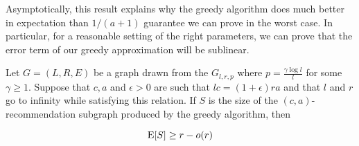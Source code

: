 Asymptotically, this result explains why the greedy
algorithm does much better in expectation than $1/(a+1)$ guarantee we
can prove in the worst case. In particular, for a reasonable setting of
the right parameters, we can prove that the error term of our greedy
approximation will be sublinear.

\begin{thm}
\label{simple-thm}
Let $G=(L,R,E)$ be a graph drawn from the $G_{l,r,p}$ where $p = \frac{\gamma \log l}{l}$ for some $\gamma \geq 1$. Suppose that $c, a$ and $\epsilon>0$ are such that $lc=(1+\epsilon)ra$ and that $l$ and $r$ go to infinity while satisfying this relation. If $S$ is the size of the $(c,a)$-recommendation subgraph produced by the greedy algorithm, then

\[ \text{E}[S] \geq r - o(r) \]
\end{thm}
%
%
%
%
%









